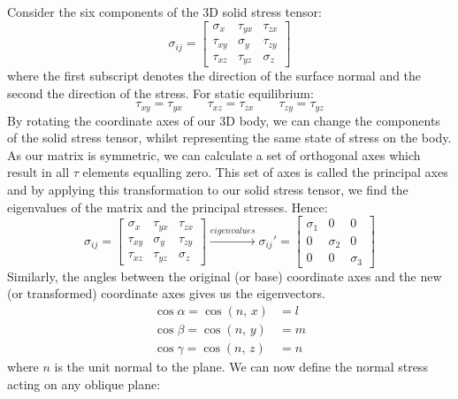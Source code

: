 Consider the six components of the 3D solid stress tensor:
\begin{equation}
    \sigma_{ij} = \begin{bmatrix}
        \sigma_x & \tau_{yx} & \tau_{zx}\\
        \tau_{xy} & \sigma_y & \tau_{zy}\\
        \tau_{xz} & \tau_{yz} & \sigma_z
    \end{bmatrix}
\end{equation}
where the first subscript denotes the direction of the surface normal and the second the direction of the stress. For static equilibrium:
\begin{equation}
    \tau_{xy} = \tau_{yx} \qquad \tau_{xz} = \tau_{zx} \qquad \tau_{zy} = \tau_{yz}
\end{equation}
By rotating the coordinate axes of our 3D body, we can change the components of the solid stress tensor, whilst representing the same state of stress on the body. As our matrix is symmetric, we can calculate a set of orthogonal axes which result in all $\tau$ elements equalling zero. This set of axes is called the principal axes and by applying this transformation to our solid stress tensor, we find the eigenvalues of the matrix and the principal stresses. Hence:
\begin{equation}
    \sigma_{ij} = \begin{bmatrix}
        \sigma_x & \tau_{yx} & \tau_{zx}\\
        \tau_{xy} & \sigma_y & \tau_{zy}\\
        \tau_{xz} & \tau_{yz} & \sigma_z
    \end{bmatrix} \xrightarrow{eigenvalues} \sigma_{ij}' = \begin{bmatrix}
        \sigma_1 & 0 & 0\\
        0 & \sigma_2 & 0\\
        0 & 0 & \sigma_3
    \end{bmatrix}
\end{equation}
Similarly, the angles between the original (or base) coordinate axes and the new (or transformed) coordinate axes gives us the eigenvectors. 
\begin{align}
    \cos \alpha = \cos\left(n, \, x\right) & = l\\
    \cos \beta = \cos\left(n, \, y\right) & = m\\
    \cos \gamma = \cos\left(n, \, z\right) & = n
\end{align}
where $n$ is the unit normal to the plane. We can now define the normal stress acting on any oblique plane:
